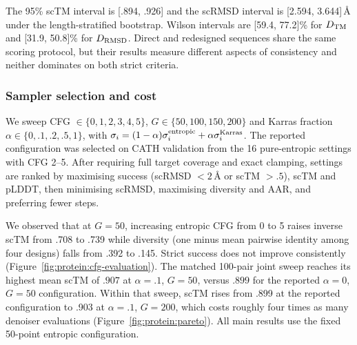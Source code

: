 
The 95\% scTM interval is [.894, .926] and the scRMSD interval is [2.594, 3.644]\,\AA{} under the length-stratified bootstrap. Wilson intervals are [59.4, 77.2]\% for $D_{\rm TM}$ and [31.9, 50.8]\% for $D_{\rm RMSD}$. Direct and redesigned sequences share the same scoring protocol, but their results measure different aspects of consistency and neither dominates on both strict criteria.

\subsubsection{Sampler selection and cost}
\label{app:protein:pareto}


We sweep CFG $\in\{0,1,2,3,4,5\}$, $G\in\{50,100,150,200\}$ and Karras fraction $\alpha\in\{0,.1,.2,.5,1\}$, with $\sigma_i=(1-\alpha)\sigma_i^{\rm entropic}+\alpha\sigma_i^{\rm Karras}$. The reported configuration was selected on CATH validation from the 16 pure-entropic settings with CFG 2--5. After requiring full target coverage and exact clamping, settings are ranked by maximising success (scRMSD $<2$\,\AA{} or scTM $>.5$), scTM and pLDDT, then minimising scRMSD, maximising diversity and AAR, and preferring fewer steps. 

We observed that at $G=50$, increasing entropic CFG from 0 to 5 raises inverse scTM from .708 to .739 while diversity (one minus mean pairwise identity among four designs) falls from .392 to .145. Strict success does not improve consistently (Figure~\ref{fig:protein:cfg-evaluation}). The matched 100-pair joint sweep reaches its highest mean scTM of $.907$ at  $\alpha=.1$, $G=50$, versus $.899$ for the reported $\alpha=0$, $G=50$ configuration. Within that sweep, scTM rises from .899 at the reported configuration to .903 at $\alpha=.1$, $G=200$, which costs roughly four times as many denoiser evaluations (Figure~\ref{fig:protein:pareto}). All main results use the fixed 50-point entropic configuration.

